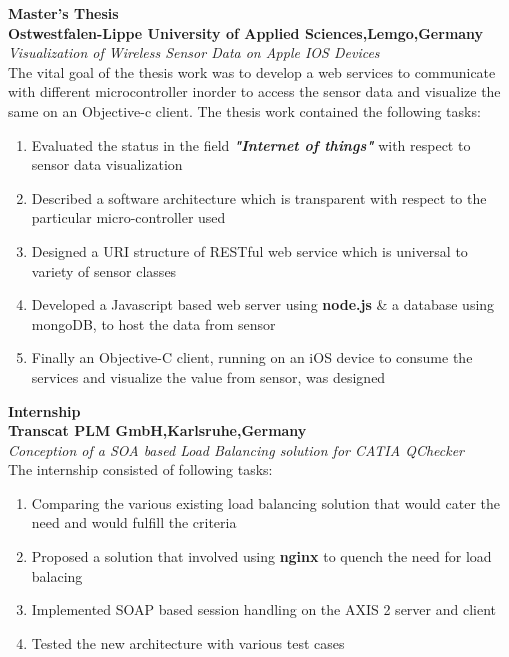 \documentclass[11.9pt]{xetexCV}
\begin{document}
\textbf{{\color{bluesubheading}Master's Thesis}} \\
\vspace{1.5mm}%
\textbf{{\color{bluesubheading}Ostwestfalen-Lippe University  of Applied Sciences,Lemgo,Germany}}\\
\textit{Visualization of Wireless Sensor Data on Apple IOS Devices }\\[1.5mm]
The vital goal of the thesis work was to develop a web services to communicate with different microcontroller inorder to access the sensor data and visualize the same on an Objective-c client. The thesis work contained the following tasks:
\begin{enumerate}[leftmargin=4.5cm,label=\textbullet]
\item Evaluated the status in the field \textbf{\textit{"Internet of things"}} with respect to sensor data visualization
\item Described a software architecture which is transparent with respect to the particular micro-controller used
\item Designed a URI structure of RESTful web service which is universal to variety of sensor classes
\item Developed a Javascript based web server using \textbf{node.js} \& a database using mongoDB, to host the data from sensor
\item Finally an Objective-C client, running on an iOS device to consume the services and visualize the value from sensor, was designed
\end{enumerate}

\textbf{{\color{bluesubheading}Internship}} \\
\vspace{1.5mm}%
\textbf{{\color{bluesubheading}Transcat PLM GmbH,Karlsruhe,Germany}}\\
\textit{{\color{bluesubheading}Conception of a SOA based Load Balancing solution for CATIA QChecker}}\\[1.5mm]
The internship consisted of following tasks:
\begin{enumerate}[leftmargin=4.5cm,label=\textbullet]
\item Comparing the various existing load balancing solution that would cater the need
and would fulfill the criteria
\item Proposed a solution that involved using \textbf{nginx} to quench the need for load balacing
\item Implemented SOAP based session handling on the AXIS 2 server and client
\item Tested the new architecture with various test cases
\end{enumerate}
\end{document}
